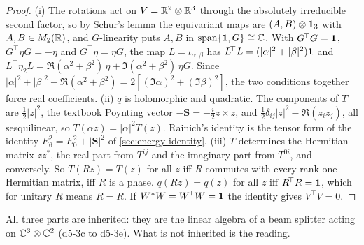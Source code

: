 \begin{proof}
(i) The rotations act on $V=\mathbb{R}^2\otimes\mathbb{R}^3$ through the absolutely irreducible second factor, so by Schur's lemma \cite{Schur} the equivariant maps
are $(A,B)\otimes\mathbf 1_3$ with $A,B\in M_2(\mathbb{R})$, and $G$-linearity puts $A,B$ in $\operatorname{span}\{\mathbf 1,G\}\cong\mathbb{C}$. With $G^{\!\top}G=\mathbf 1$,
$G^{\!\top}\eta G=-\eta$ and $G^{\!\top}\eta=\eta G$, the map $L=\iota_{\alpha,\beta}$ has $L^{\!\top}L=(|\alpha|^2+|\beta|^2)\mathbf 1$ and
$L^{\!\top}\eta_2L=\Re(\alpha^2+\beta^2)\,\eta+\Im(\alpha^2+\beta^2)\,\eta G$. Since $|\alpha|^2+|\beta|^2-\Re(\alpha^2+\beta^2)=2[(\Im\alpha)^2+(\Im\beta)^2]$, the two
conditions together force real coefficients. (ii) $q$ is holomorphic and quadratic. The components of $T$ are $\tfrac12|z|^2$,
the textbook Poynting vector $-\mathbf S=-\tfrac i2\bar z\times z$, and $\tfrac12\delta_{ij}|z|^2-\Re(\bar z_iz_j)$, all sesquilinear, so $T(\alpha z)=|\alpha|^2T(z)$. Rainich's identity is the
tensor form of the identity $E_6^2=E_0^2+|\mathbf S|^2$ of \cref{sec:energy-identity}. (iii) $T$ determines the Hermitian matrix $zz^*$, the real part from $T^{ij}$ and
the imaginary part from $T^{0i}$, and conversely. So $T(Rz)=T(z)$ for all $z$ iff $R$ commutes with every rank-one Hermitian matrix, iff $R$ is a
phase. $q(Rz)=q(z)$ for all $z$ iff $R^{\!\top}R=\mathbf 1$, which for unitary $R$ means $\bar R=R$. If $W^*W=W^{\!\top}W=\mathbf 1$ the identity gives
$V^{\!\top}V=0$.
\end{proof}

All three parts are inherited: they are the linear algebra of a beam splitter acting on $\mathbb{C}^3\otimes\mathbb{C}^2$ (d5-3c to d5-3e). What is not
inherited is the reading.

